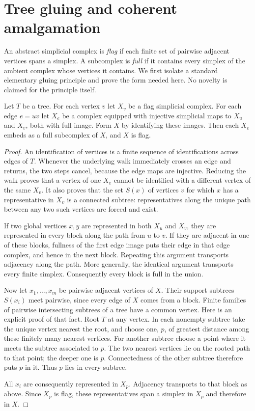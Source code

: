 \section{Tree gluing and coherent amalgamation}\label{sec:trees}


An abstract simplicial complex is \emph{flag} if each finite set of pairwise
adjacent vertices spans a simplex. A subcomplex is \emph{full} if it contains
every simplex of the ambient complex whose vertices it contains. We first
isolate a standard elementary gluing principle and prove the form needed
here. No novelty is claimed for the principle itself.

\begin{lemma}\label{T-lem:tree}
Let $T$ be a tree. For each vertex $v$ let $X_v$ be a flag simplicial
complex. For each edge $e=uv$ let $X_e$ be a complex equipped with
injective simplicial maps to $X_u$ and $X_v$, both with full image.
Form $X$ by identifying these images. Then each $X_v$ embeds as a full
subcomplex of $X$, and $X$ is flag.
\end{lemma}
\begin{proof}
An identification of vertices is a finite sequence of identifications
across edges of $T$. Whenever the underlying walk immediately crosses an
edge and returns, the two steps cancel, because the edge maps are
injective. Reducing the walk proves that a vertex of one $X_v$ cannot
be identified with a different vertex of the same $X_v$. It also proves
that the set $S(x)$ of vertices $v$ for which $x$ has a representative
in $X_v$ is a connected subtree: representatives along the unique path
between any two such vertices are forced and exist.

If two global vertices $x,y$ are represented in both $X_u$ and $X_v$,
they are represented in every block along the path from $u$ to $v$.
If they are adjacent in one of these blocks, fullness of the first edge
image puts their edge in that edge complex, and hence in the next block.
Repeating this argument transports adjacency along the path. More
generally, the identical argument transports every finite simplex.
Consequently every block is full in the union.

Now let $x_1,\ldots,x_m$ be pairwise adjacent vertices of $X$.
Their support subtrees $S(x_i)$ meet pairwise, since every edge of $X$
comes from a block. Finite families of pairwise intersecting subtrees
of a tree have a common vertex. Here is an explicit proof of that fact.
Root $T$ at any vertex. In each nonempty subtree take the unique vertex
nearest the root, and choose one, $p$, of greatest distance among these
finitely many nearest vertices. For another subtree choose a point where
it meets the subtree associated to $p$. The two nearest vertices lie on
the rooted path to that point; the deeper one is $p$. Connectedness of
the other subtree therefore puts $p$ in it. Thus $p$ lies in every subtree.

All $x_i$ are consequently represented in $X_p$. Adjacency transports
to that block as above. Since $X_p$ is flag, these representatives span
a simplex in $X_p$ and therefore in $X$.
\end{proof}

